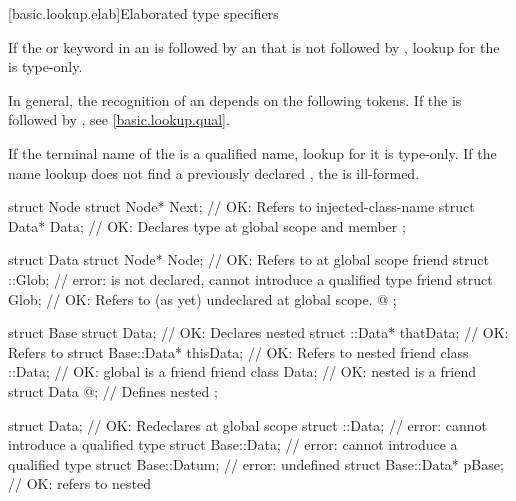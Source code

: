 %

[basic.lookup.elab]{Elaborated type specifiers}%
%

\pnum
If the  or  keyword
in an 
is followed by an 
that is not followed by \tcode{::},
lookup for the  is type-only.
\begin{note}
In general, the recognition of an 
depends on the following tokens.
If the  is followed by \tcode{::},
see \ref{basic.lookup.qual}.
\end{note}

\pnum
If the terminal name of the 
is a qualified name,
lookup for it is type-only.
If the name lookup does not find a previously declared ,
the  is ill-formed.

\pnum
\begin{example}
\begin{codeblock}
struct Node {
  struct Node* Next;            // OK: Refers to injected-class-name 
  struct Data* Data;            // OK: Declares type  at global scope and member 
};

struct Data {
  struct Node* Node;            // OK: Refers to  at global scope
  friend struct ::Glob;         // error:  is not declared, cannot introduce a qualified type
  friend struct Glob;           // OK: Refers to (as yet) undeclared  at global scope.
  @\commentellip@
};

struct Base {
  struct Data;                  // OK: Declares nested 
  struct ::Data*     thatData;  // OK: Refers to 
  struct Base::Data* thisData;  // OK: Refers to nested 
  friend class ::Data;          // OK: global  is a friend
  friend class Data;            // OK: nested  is a friend
  struct Data { @\commentellip@ };    // Defines nested 
};

struct Data;                    // OK: Redeclares  at global scope
struct ::Data;                  // error: cannot introduce a qualified type
struct Base::Data;              // error: cannot introduce a qualified type
struct Base::Datum;             // error:  undefined
struct Base::Data* pBase;       // OK: refers to nested 
\end{codeblock}
\end{example}
%

